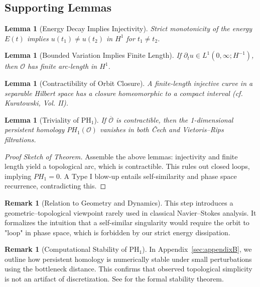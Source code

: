 \documentclass[11pt]{article}
\newtheorem{lemma}[theorem]{Lemma}
\theoremstyle{definition}
\newtheorem{remark}[theorem]{Remark}
\begin{document}
\subsection*{Supporting Lemmas}
\begin{lemma}[Energy Decay Implies Injectivity]
Strict monotonicity of the energy \( E(t) \) implies \( u(t_1) \ne u(t_2) \) in \( H^1 \) for \( t_1 \ne t_2 \).
\end{lemma}

\begin{lemma}[Bounded Variation Implies Finite Length]
If \( \partial_t u \in L^1(0,\infty; H^{-1}) \), then \( \mathcal{O} \) has finite arc-length in \( H^1 \).
\end{lemma}

\begin{lemma}[Contractibility of Orbit Closure]
A finite-length injective curve in a separable Hilbert space has a closure homeomorphic to a compact interval (cf. Kuratowski, Vol. II).
\end{lemma}

\begin{lemma}[Triviality of PH$_1$]
If \( \overline{\mathcal{O}} \) is contractible, then the 1-dimensional persistent homology \( PH_1(\mathcal{O}) \) vanishes in both Čech and Vietoris–Rips filtrations.
\end{lemma}

\begin{proof}[Proof Sketch of Theorem]
Assemble the above lemmas: injectivity and finite length yield a topological arc, which is contractible. This rules out closed loops, implying \( PH_1 = 0 \). A Type I blow-up entails self-similarity and phase space recurrence, contradicting this.
\end{proof}

\begin{remark}[Relation to Geometry and Dynamics]
This step introduces a geometric–topological viewpoint rarely used in classical Navier–Stokes analysis. It formalizes the intuition that a self-similar singularity would require the orbit to "loop" in phase space, which is forbidden by our strict energy dissipation.
\end{remark}

\begin{remark}[Computational Stability of PH$_1$]
In Appendix~\ref{sec:appendixB}, we outline how persistent homology is numerically stable under small perturbations using the bottleneck distance. This confirms that observed topological simplicity is not an artifact of discretization. See \cite{CohenSteiner2007} for the formal stability theorem.
\end{remark}
\end{document}
